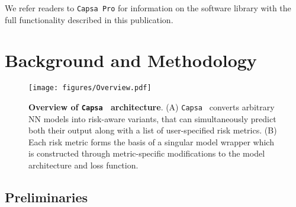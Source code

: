 \documentclass{article} %
\def\Capsa{\texttt{{Capsa}}}
\begin{document}
We refer readers to \texttt{{Capsa Pro}} \citep{capsa-pro} for information on the software library with the full functionality described in this publication.





\section{Background and Methodology}
\begin{figure*}[b!]
\vspace{-10pt}
\centering
\texttt{[image: figures/Overview.pdf]}
\caption{\textbf{Overview of \Capsa~ architecture}. (A) \Capsa~ converts arbitrary NN models into risk-aware variants, that can simultaneously predict both their output along with a list of user-specified risk metrics. (B) Each risk metric forms the basis of a singular model wrapper which is constructed through metric-specific modifications to the model architecture and loss function.}
\label{fig:teaser}
\end{figure*}


\subsection{Preliminaries}
\end{document}
